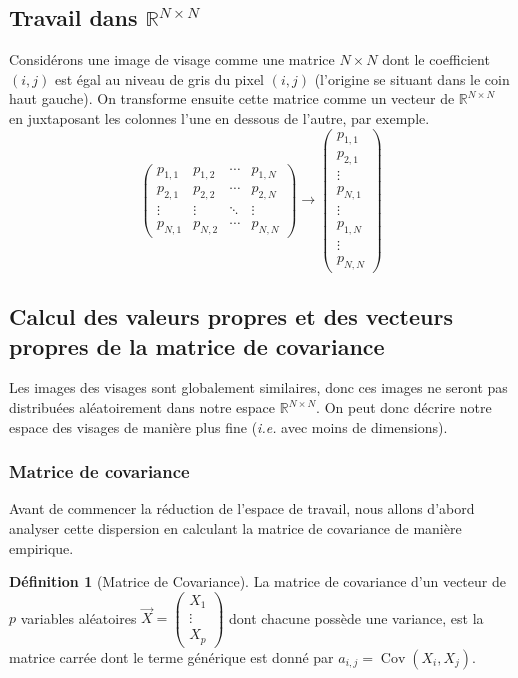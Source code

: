 \documentclass[12pt,french]{article}
\theoremstyle{plain}
\theoremstyle{definition}
\newtheorem{defi}{Définition}
\DeclareMathOperator\Cov{Cov}
\begin{document}
\subsection{Travail dans $\mathbb{R}^{N \times N}$}
Considérons une image de visage comme une matrice $N \times N$ dont le coefficient $(i,j)$ est égal au niveau de gris du pixel $(i,j)$ (l'origine se situant dans le coin haut gauche).
On transforme ensuite cette matrice comme un vecteur de $\mathbb{R}^{N \times N}$ en juxtaposant les colonnes l'une en dessous de l'autre, par exemple.
\[
  \begin{pmatrix}
    p_{1,1} & p_{1,2} & \cdots & p_{1,N} \\
    p_{2,1} & p_{2,2} & \cdots & p_{2,N} \\
    \vdots  & \vdots  & \ddots & \vdots  \\
    p_{N,1} & p_{N,2} & \cdots & p_{N,N}
  \end{pmatrix}
  \rightarrow
  \begin{pmatrix}
    p_{1,1} \\
    p_{2,1} \\
    \vdots \\
    p_{N,1} \\
    \vdots \\
    p_{1,N} \\
    \vdots \\
    p_{N,N}
  \end{pmatrix}
\]

\subsection{Calcul des valeurs propres et des vecteurs propres de la matrice de covariance}
Les images des visages sont globalement similaires, donc ces images ne seront pas distribuées aléatoirement dans notre espace $\mathbb{R}^{N \times N}$.
On peut donc décrire notre espace des visages de manière plus fine (\textit{i.e.} avec moins de dimensions).


\subsubsection{Matrice de covariance}
Avant de commencer la réduction de l'espace de travail, nous allons d'abord analyser cette dispersion en calculant la matrice de covariance de manière empirique.

\begin{defi}[Matrice de Covariance]
  La matrice de covariance d'un vecteur de $p$ variables aléatoires $\overrightarrow{X} =
  \begin{pmatrix}
    X_1 \\
    \vdots \\
    X_p
  \end{pmatrix}$ dont chacune possède une variance, est la matrice carrée dont le terme générique est donné par $a_{i,j} = \Cov(X_i,X_j)$.
\end{defi}
\end{document}
